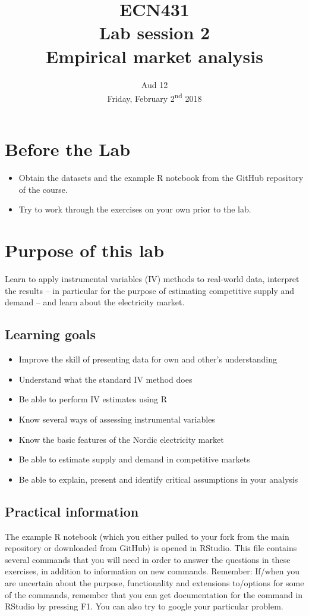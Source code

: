 \documentclass[12pt,a4paper]{article}
\title{ECN431\\Lab session 2\\Empirical market analysis}
\date{Aud 12 \\ Friday, February 2\textsuperscript{nd} 2018}
\begin{document}
\maketitle

\section*{Before the Lab}
\begin{itemize}
\item Obtain the datasets and the example R notebook from the GitHub repository of the course.
\item Try to work through the exercises on your own prior to the lab.
\end{itemize}

\section*{Purpose of this lab}
Learn to apply instrumental variables (IV) methods to real-world data, interpret the results -- in particular for the purpose of estimating competitive supply and demand -- and learn about the electricity market.

\subsection*{Learning goals}
\begin{itemize}
\item	Improve the skill of presenting data for own and other's understanding
\item	Understand what the standard IV method does
\item	Be able to perform IV estimates using R
\item	Know several ways of assessing instrumental variables
\item	Know the basic features of the Nordic electricity market
\item	Be able to estimate supply and demand in competitive markets
\item	Be able to explain, present and identify critical assumptions in your analysis
\end{itemize}


\subsection*{Practical information}
The example R notebook (which you either pulled to your fork from the main repository or downloaded from GitHub) is opened in RStudio. This file contains several commands that you will need in order to answer the questions in these exercises, in addition to information on new commands. Remember: If/when you are uncertain about the purpose, functionality and extensions to/options for some of the commands, remember that you can get documentation for the command in RStudio by pressing F1. You can also try to google your particular problem.
\end{document}
